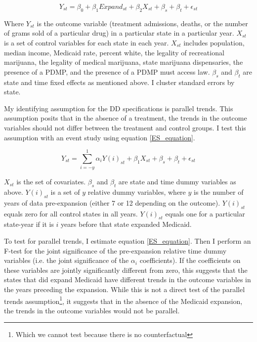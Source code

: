 \documentclass[11pt]{article}
\begin{document}
\begin{equation}
    Y_{st}=\beta_0+\beta_1 Expand_{st}+\beta_2 X_{st} + \beta_s + \beta_t + \epsilon_{st}
     \label{DD}
\end{equation}


Where $Y_{st}$ is the outcome variable (treatment admissions, deaths, or the number of grams sold of a particular drug) in a particular state in a particular year.  $X_{st}$  is a set of control variables for each state in each year. $X_{st}$  includes population, median income, Medicaid rate, percent white, the legality of recreational marijuana, the legality of medical marijuana, state marijuana dispensaries, the presence of a PDMP, and the presence of a PDMP must access law.  $\beta_s$ and $\beta_t$ are state and time fixed effects as mentioned above.  I cluster standard errors by state.


My identifying assumption for the DD specifications is parallel trends. This assumption posits that in the absence of a treatment, the trends in the outcome variables should not differ between the treatment and control groups.  I test this assumption with an event study using equation \ref{ES_equation}.      

\begin{equation}
    Y_{st}=\sum_{i=-y}^1 \alpha_i Y(i)_{st}+\beta_{1} X_{st} + \beta_s + \beta_t + \epsilon_{st}
     \label{ES_equation}
\end{equation}

$X_{st}$ is the set of covariates.  $\beta_s$ and $\beta_t$ are state and time dummy variables as above. $Y(i)_{st}$ is a set of $y$ relative dummy variables, where $y$ is the number of years of data pre-expansion (either 7 or 12 depending on the outcome). $Y(i)_{st}$ equals zero for all control states in all years. $Y(i)_{st}$ equals one for a particular state-year if it is $i$ years before that state expanded Medicaid.      

To test for parallel trends, I estimate equation \ref{ES_equation}.  Then I perform an F-test for the joint significance of the pre-expansion  relative time dummy variables (i.e. the joint significance of the  $\alpha_i$ coefficients).  If the coefficients on these variables are jointly significantly different from zero, this suggests that the states that did expand Medicaid have different trends in the outcome variables in the years preceding the expansion.  While this is not a direct test of the parallel trends assumption\footnote{Which we cannot test because there is no counterfactual}, it suggests that in the absence of the Medicaid expansion, the trends in the outcome variables would not be parallel. 
\end{document}

